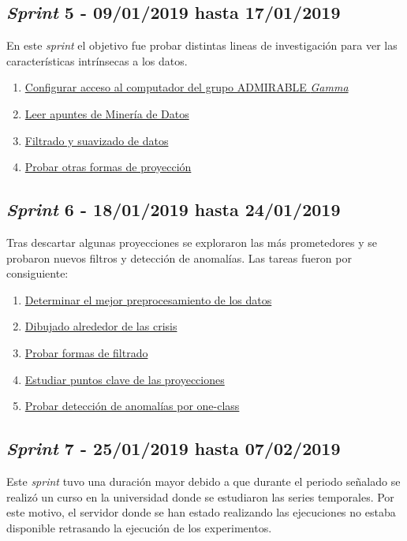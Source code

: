 \subsection{\textit{Sprint} 5 - 09/01/2019 hasta 17/01/2019}
En este \textit{sprint} el objetivo fue probar distintas lineas de investigación para ver las características intrínsecas a los datos.

\begin{enumerate}\addtocounter{enumi}{12}
	\item \href{https://github.com/joselucross/TFG-SmartBeds/issues/13}{ Configurar acceso al computador del grupo ADMIRABLE \textit{Gamma}}
	\item \href{https://github.com/joselucross/TFG-SmartBeds/issues/14}{ Leer apuntes de Minería de Datos}
	\item \href{https://github.com/joselucross/TFG-SmartBeds/issues/15}{ Filtrado y suavizado de datos}
	\item \href{https://github.com/joselucross/TFG-SmartBeds/issues/16}{ Probar otras formas de proyección}
\end{enumerate}	

\subsection{\textit{Sprint} 6 - 18/01/2019 hasta 24/01/2019}
Tras descartar algunas proyecciones se exploraron las más prometedores y se probaron nuevos filtros y detección de anomalías. Las tareas fueron por consiguiente:

\begin{enumerate}\addtocounter{enumi}{16}
	\item \href{https://github.com/joselucross/TFG-SmartBeds/issues/17}{ Determinar el mejor preprocesamiento de los datos}
	\item \href{https://github.com/joselucross/TFG-SmartBeds/issues/18}{ Dibujado alrededor de las crisis}
	\item \href{https://github.com/joselucross/TFG-SmartBeds/issues/19}{ Probar formas de filtrado}
	\item \href{https://github.com/joselucross/TFG-SmartBeds/issues/20}{ Estudiar puntos clave de las proyecciones}
	\item \href{https://github.com/joselucross/TFG-SmartBeds/issues/21}{ Probar detección de anomalías por one-class}
\end{enumerate}

\subsection{\textit{Sprint} 7 - 25/01/2019 hasta 07/02/2019}
Este \textit{sprint} tuvo una duración mayor debido a que durante el periodo señalado se realizó un curso en la universidad donde se estudiaron las series temporales. Por este motivo, el servidor donde se han estado realizando las ejecuciones no estaba disponible retrasando la ejecución de los experimentos.

